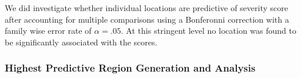\documentclass[10pt]{article}\usepackage[]{graphicx}\usepackage[]{color}
\begin{document}
 
We did investigate whether individual locations are predictive of severity score after accounting for multiple comparisons using a Bonferonni correction with a family wise error rate of $\alpha=.05$. At this stringent level no location was found to be significantly associated with the scores. 



\subsubsection{Highest Predictive Region Generation and Analysis}
\end{document}
